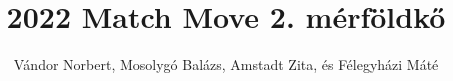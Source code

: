 \documentclass[sigplan,11pt,nonacm=true]{acmart}
\begin{document}
\title{2022 Match Move 2. mérföldkő}


\author{Vándor Norbert, Mosolygó Balázs, Amstadt Zita, és Félegyházi Máté}


\maketitle






\end{document}
